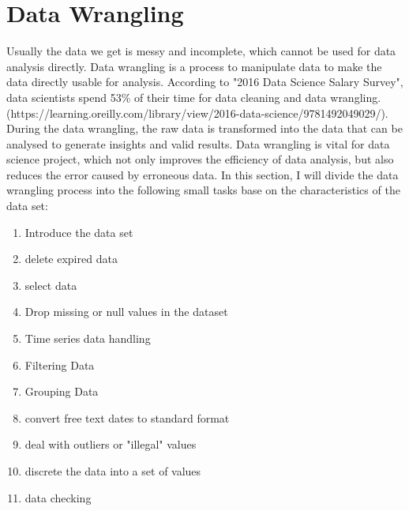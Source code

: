 \documentclass[11pt]{article}
\theoremstyle{definition}
\begin{document}
\section{Data Wrangling} 
\label{dataWrangling}
Usually the data we get is messy and incomplete, which cannot be used for data analysis directly. Data wrangling is a process to manipulate data to make the data directly usable for analysis. According to "2016 Data Science Salary Survey",  data scientists spend 53\% of their time for data cleaning and data wrangling. (https://learning.oreilly.com/library/view/2016-data-science/9781492049029/). During the data wrangling, the raw data is transformed into the data that can be analysed to generate insights and valid results. Data wrangling is vital for data science project, which not only improves the efficiency of data analysis, but also reduces the error caused by erroneous data. In this section, I will divide the data wrangling process into the following small tasks base on the characteristics of the data set:
\begin{enumerate}
	\item Introduce the data set
	\item delete expired data
	\item select data
	\item Drop missing or null values in the dataset
	\item Time series data handling	
	\item Filtering Data
	\item Grouping Data
	\item convert free text dates to standard format
	\item deal with outliers or "illegal" values
	\item discrete the data into a set of values
	\item data checking
\end{enumerate}
\end{document}

